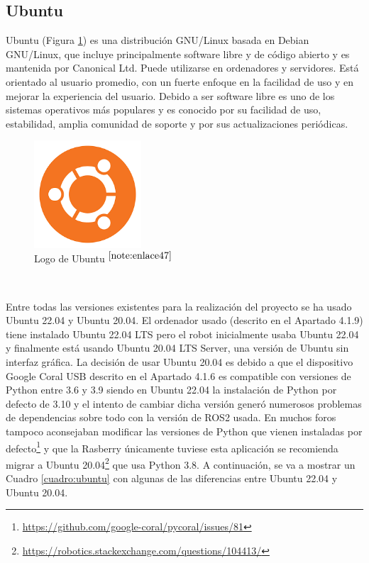 \setcounter{footnote}{46} %


\subsection{Ubuntu}

Ubuntu (Figura \ref{fig:ubuntu}) es una distribución GNU/Linux basada en Debian GNU/Linux, que incluye principalmente software libre y de código abierto y es mantenida por Canonical Ltd. Puede utilizarse en ordenadores y servidores. Está orientado al usuario promedio, con un fuerte enfoque en la facilidad de uso y en mejorar la experiencia del usuario. Debido a ser software libre es uno de los sistemas operativos más populares y es conocido por su facilidad de uso, estabilidad, amplia comunidad de soporte y por sus actualizaciones periódicas.

\begin{figure} [h!]
	\begin{center}
		\includegraphics[width=4cm]{figs/ubuntu.png}
	\end{center}
	\caption{Logo de Ubuntu $^{\ref{note:enlace47}}$} 
	\label{fig:ubuntu}
\end{figure}\

\setcounter{footnote}{47} %

Entre todas las versiones existentes para la realización del proyecto se ha usado Ubuntu 22.04 y Ubuntu 20.04. El ordenador usado (descrito en el Apartado 4.1.9) tiene instalado Ubuntu 22.04 \ac{LTS} pero el robot inicialmente usaba Ubuntu 22.04 y finalmente está usando Ubuntu 20.04 \acs{LTS} Server, una versión de Ubuntu sin interfaz gráfica. La decisión de usar Ubuntu 20.04 es debido a que el dispositivo Google Coral USB descrito en el Apartado 4.1.6 es compatible con versiones de Python entre 3.6 y 3.9 siendo en Ubuntu 22.04 la instalación de Python por defecto de 3.10 y el intento de cambiar dicha versión generó numerosos problemas de dependencias sobre todo con la versión de ROS2 usada. En muchos foros tampoco aconsejaban modificar las versiones de Python que vienen instaladas por defecto\footnote{\url{https://github.com/google-coral/pycoral/issues/81}} y que la Rasberry únicamente tuviese esta aplicación se recomienda migrar a Ubuntu 20.04\footnote{\url{https://robotics.stackexchange.com/questions/104413/}} que usa Python 3.8. A continuación, se va a mostrar un Cuadro \ref{cuadro:ubuntu} con algunas de las diferencias entre Ubuntu 22.04 y Ubuntu 20.04.

